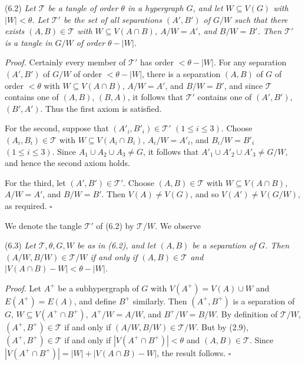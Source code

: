 \stmt
(6.2) \textit{Let $\mathscr{T}$ be a tangle of order $\theta$ in a hypergraph $G$, and let $W \subseteq V(G)$ with $|W| < \theta$. Let $\mathscr{T}'$ be the set of all separations $(A', B')$ of $G/W$ such that there exists $(A, B) \in \mathscr{T}$ with $W \subseteq V(A \cap B)$, $A/W = A'$, and $B/W = B'$. Then $\mathscr{T}'$ is a tangle in $G/W$ of order $\theta - |W|$.}

\textit{Proof.} Certainly every member of $\mathscr{T}'$ has order $< \theta - |W|$. For any separation $(A', B')$ of $G/W$ of order $< \theta - |W|$, there is a separation $(A, B)$ of $G$ of order $< \theta$ with $W \subseteq V(A \cap B)$, $A/W = A'$, and $B/W = B'$, and since $\mathscr{T}$ contains one of $(A, B)$, $(B, A)$, it follows that $\mathscr{T}'$ contains one of $(A', B')$, $(B', A')$. Thus the first axiom is satisfied.

For the second, suppose that $(A'_i, B'_i) \in \mathscr{T}'$ $(1 \le i \le 3)$. Choose $(A_i, B_i) \in \mathscr{T}$ with $W \subseteq V(A_i \cap B_i)$, $A_i/W = A'_i$, and $B_i/W = B'_i$ $(1 \le i \le 3)$. Since $A_1 \cup A_2 \cup A_3 \ne G$, it follows that $A'_1 \cup A'_2 \cup A'_3 \ne G/W$, and hence the second axiom holds.

For the third, let $(A', B') \in \mathscr{T}'$. Choose $(A, B) \in \mathscr{T}$ with $W \subseteq V(A \cap B)$, $A/W = A'$, and $B/W = B'$. Then $V(A) \ne V(G)$, and so $V(A') \ne V(G/W)$, as required. $\square$

We denote the tangle $\mathscr{T}'$ of (6.2) by $\mathscr{T}/W$. We observe

\stmt
(6.3) \textit{Let $\mathscr{T}, \theta, G, W$ be as in (6.2), and let $(A, B)$ be a separation of $G$. Then $(A/W, B/W) \in \mathscr{T}/W$ if and only if $(A, B) \in \mathscr{T}$ and $|V(A \cap B) - W| < \theta - |W|$.}

\textit{Proof.} Let $A^+$ be a subhypergraph of $G$ with $V(A^+) = V(A) \cup W$ and $E(A^+) = E(A)$, and define $B^+$ similarly. Then $(A^+, B^+)$ is a separation of $G$, $W \subseteq V(A^+ \cap B^+)$, $A^+/W = A/W$, and $B^+/W = B/W$. By definition of $\mathscr{T}/W$, $(A^+, B^+) \in \mathscr{T}$ if and only if $(A/W, B/W) \in \mathscr{T}/W$. But by (2.9), $(A^+, B^+) \in \mathscr{T}$ if and only if $|V(A^+ \cap B^+)| < \theta$ and $(A, B) \in \mathscr{T}$. Since $|V(A^+ \cap B^+)| = |W| + |V(A \cap B) - W|$, the result follows. $\square$


